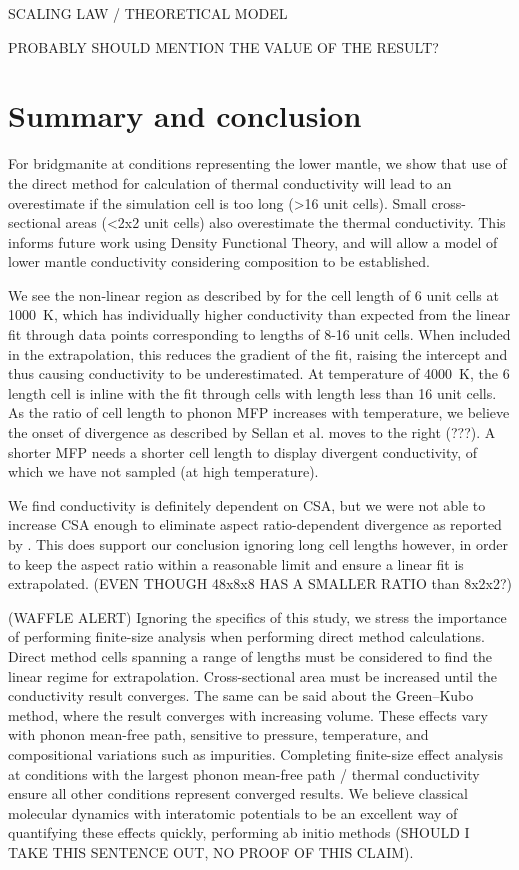 \documentclass[%
preprint,                                  %
nofootinbib,
 amsmath,amssymb,
 aps,
]{revtex4-1}
\begin{document}
SCALING LAW / THEORETICAL MODEL

PROBABLY SHOULD MENTION THE VALUE OF THE RESULT?







\section{\label{sec:summary}Summary and conclusion}

For bridgmanite at conditions representing the lower mantle, we show that use of the direct method for calculation of thermal conductivity will lead to an overestimate if the simulation cell is too long (\textgreater 16 unit cells). Small cross-sectional areas (\textless 2x2 unit cells) also overestimate the thermal conductivity. This informs future work using Density Functional Theory, and will allow a model of lower mantle conductivity considering composition to be established.

We see the non-linear region as described by \citet{Sellan2010} for the cell length of 6 unit cells at 1000~K, which has individually higher conductivity than expected from the linear fit through data points corresponding to lengths of 8-16 unit cells. When included in the extrapolation, this reduces the gradient of the fit, raising the intercept and thus causing conductivity to be underestimated. At temperature of 4000~K, the 6 length cell is inline with the fit through cells with length less than 16 unit cells. As the ratio of cell length to phonon MFP increases with temperature, we believe the onset of divergence as described by Sellan et al. moves to the right (???). A shorter MFP needs a shorter cell length to display divergent conductivity, of which we have not sampled (at high temperature). 

We find conductivity is definitely dependent on CSA, but we were not able to increase CSA enough to eliminate aspect ratio-dependent divergence as reported by \citet{Hu2011}. This does support our conclusion ignoring long cell lengths however, in order to keep the aspect ratio within a reasonable limit and ensure a linear fit is extrapolated. (EVEN THOUGH 48x8x8 HAS A SMALLER RATIO than 8x2x2?)

(WAFFLE ALERT) Ignoring the specifics of this study, we stress the importance of performing finite-size analysis when performing direct method calculations.  Direct method cells spanning a range of lengths must be considered to find the linear regime for extrapolation. Cross-sectional area must be increased until the conductivity result converges. The same can be said about the Green--Kubo method, where the result converges with increasing volume. These effects vary with phonon mean-free path, sensitive to pressure, temperature, and compositional variations such as impurities. Completing finite-size effect analysis at conditions with the largest phonon mean-free path / thermal conductivity ensure all other conditions represent converged results. We believe classical molecular dynamics with interatomic potentials to be an excellent way of quantifying these effects quickly, performing ab initio methods (SHOULD I TAKE THIS SENTENCE OUT, NO PROOF OF THIS CLAIM).
\end{document}

